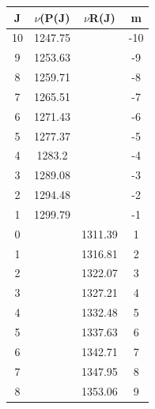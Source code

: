 \documentclass[14pt]{extarticle}
\begin{document}
\begin{table}
\begin{minipage}[t]{0.5\textwidth}
\centering
\begin{tabular}{|c|c|c|c|}
\hline
J & $\nu$(P(J) & $\nu$R(J) & m \\
\hline
10& 1247.75 & & -10 \\
9& 1253.63 & & -9 \\
8& 1259.71 & & -8 \\
7& 1265.51 & & -7 \\
6& 1271.43 & & -6 \\
5& 1277.37 & & -5 \\
4& 1283.2 & & -4 \\
3& 1289.08 & & -3 \\
2& 1294.48 & & -2 \\
1& 1299.79 & & -1 \\
0& & 1311.39 & 1 \\
1& & 1316.81 & 2 \\
2& & 1322.07 & 3 \\
3& & 1327.21 & 4 \\
4& & 1332.48 & 5 \\
5& & 1337.63 & 6 \\
6& & 1342.71 & 7 \\
7& & 1347.95 & 8 \\
8& & 1353.06 & 9 \\
\hline
\end{tabular}

\end{minipage}
\end{table}

\clearpage
\end{document}
